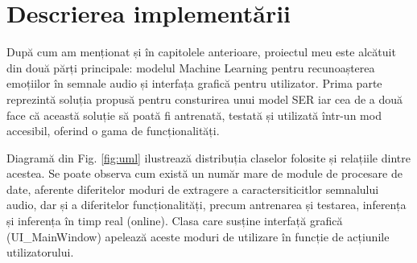 \documentclass[a4paper,12pt]{book}
\begin{document}
		\chapter{Descrierea implementării}
				După cum am menționat și în capitolele anterioare, proiectul meu este alcătuit din două părți principale: modelul Machine Learning pentru recunoașterea emoțiilor în semnale audio și interfața grafică pentru utilizator. Prima parte reprezintă soluția propusă pentru consturirea unui model SER iar cea de a două face că această soluție să poată fi antrenată, testată și utilizată într-un mod accesibil, oferind o gama de funcționalități.\par 
				Diagramă din Fig. \ref{fig:uml} ilustrează distribuția claselor folosite și relațiile dintre acestea. Se poate observa cum există un număr mare de module de procesare de date, aferente diferitelor moduri de extragere a caractersiticitlor semnalului audio, dar și a diferitelor funcționalități, precum antrenarea și testarea, inferența și inferența în timp real (online). Clasa care susține interfață grafică (UI\_MainWindow) apelează aceste moduri de utilizare în funcție de acțiunile utilizatorului. \par
				
\end{document}
